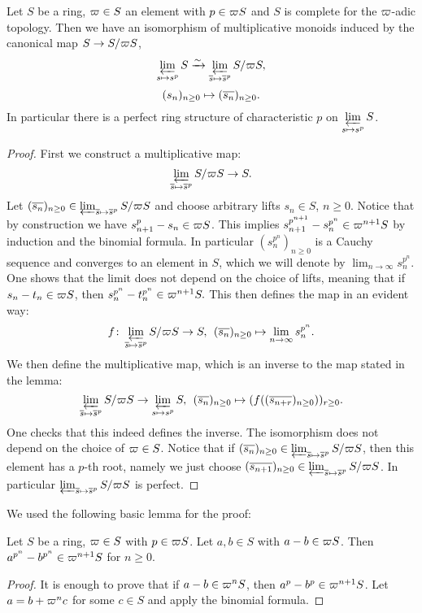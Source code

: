 \begin{lemma}\label{keylemma}
Let $S$ be a ring, $\varpi\in S$ an element with $p\in\varpi S$ and $S$ is complete for the $\varpi$-adic topology. Then we have an isomorphism of multiplicative monoids induced by the canonical map $S\to S/\varpi S$,
\[\varprojlim_{s\mapsto s^p}S\xrightarrow{\sim}\varprojlim_{\overline{s}\mapsto\overline{s}^p}S/\varpi S,\]
\[(s_n)_{n\geq0} \mapsto (\overline{s_n})_{n\geq0}.\]
In particular there is a perfect ring structure of characteristic $p$ on $\displaystyle\varprojlim_{s\mapsto s^p}S$.
\end{lemma} 
\begin{proof}
First we construct a multiplicative map: 
\[\displaystyle\varprojlim_{\overline{s}\mapsto\overline{s}^p}S/\varpi S\to S.\]
Let $ (\overline{s_n})_{n\geq0}\in\varprojlim_{\overline{s}\mapsto\overline{s}^p}S/\varpi S$ and choose arbitrary lifts
$s_n\in S$, $n\geq0$. Notice that by construction we have $s^p_{n+1}-s_n\in\varpi S$.
This implies $s^{p^{n+1}}_{n+1}-s^{p^n}_n\in\varpi^{n+1}S$ by induction and the binomial formula. In particular $(s_n^{p^n})_{n\geq0}$ is a Cauchy sequence and converges to an element in $S$, which we will denote by $\lim_{n\to\infty}s_n^{p^n}$.
One shows that the limit does not depend on the choice of lifts, 
meaning that if $s_n-t_n\in\varpi S$, then $s_n^{p^n}-t_n^{p^n}\in\varpi^{n+1}S.$ This then defines the map in an evident way:
\[f\colon\displaystyle\varprojlim_{\overline{s}\mapsto\overline{s}^p}S/\varpi S\to S, \:\:(\overline{s_n})_{n\geq0}\mapsto \lim_{n\to\infty}s_n^{p^n}.\]
We then define the multiplicative map, which is an inverse to the map stated in the lemma:
\[\varprojlim_{\overline{s}\mapsto\overline{s}^p}S/\varpi S\rightarrow\varprojlim_{s\mapsto s^p}S,\:\: (\overline{s_n})_{n\geq0} \mapsto (f((\overline{s_{n+r}})_{n\geq0}))_{r\geq0}.\]
One checks that this indeed defines the inverse. The isomorphism does not depend on the choice of $\varpi\in S$.
Notice that if $(\overline{s_n})_{n\geq0}\in\varprojlim_{\overline{s}\mapsto\overline{s}^p}S/\varpi S$, then this element has a $p$-th root, namely we just choose
$(\overline{s_{n+1}})_{n\geq0}\in\varprojlim_{\overline{s}\mapsto\overline{s}^p}S/\varpi S$. In particular $\varprojlim_{\overline{s}\mapsto\overline{s}^p}S/\varpi S$ is perfect.

\end{proof}

We used the following basic lemma for the proof:
\begin{lemma}
Let $S$ be a ring, $\varpi\in S$ with $p\in\varpi S$. Let $a,b\in S$ with $a-b\in\varpi S$. Then $a^{p^n}-b^{p^n}\in\varpi^{n+1}S$ for $n\geq 0$.
\end{lemma}
\begin{proof}
It is enough to prove that if $a-b\in\varpi^n S$, then $a^p-b^p\in\varpi^{n+1} S$.  
Let $a=b+\varpi^nc$ for some $c\in S$ and apply the binomial formula.
\end{proof}


